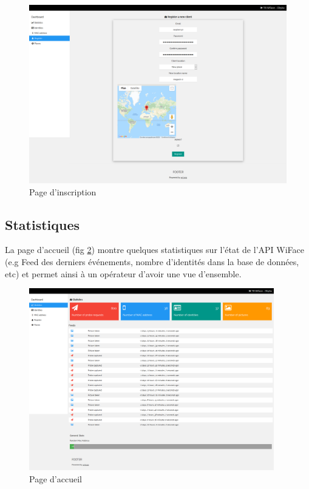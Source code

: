 \clearpage
\newpage
\thispagestyle{empty}
\begin{landscape}
    \centering
\thispagestyle{empty}
\begin{figure}[H]
	\includegraphics[width=0.95\linewidth]{images/dashboard/register.png}
	\caption{Page d'inscription}
	\label{fig:dashboard_register}
\end{figure}
\end{landscape}

\subsection{Statistiques}

La page d'accueil (fig \ref{fig:dashboard_stats}) montre quelques statistiques sur l'état de l'API WiFace (e.g Feed des derniers événements, nombre d'identités dans la base de données, etc)
et permet ainsi à un opérateur d'avoir une vue d'ensemble.
\clearpage
\newpage
\thispagestyle{empty}
\begin{landscape}
    \centering
\thispagestyle{empty}
\begin{figure}[H]
	\includegraphics[width=0.95\textwidth]{images/dashboard/statistics.png}
	\caption{Page d'accueil}
	\label{fig:dashboard_stats}
\end{figure}
\end{landscape}

